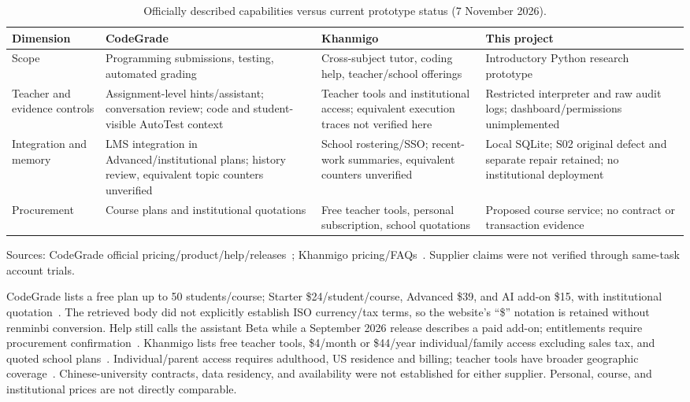 \begin{table}[htbp]\centering\small
\caption{Officially described capabilities versus current prototype status (7 November 2026).}\label{tab:concise-business-competitors}
\begin{tabularx}{\linewidth}{@{}p{23mm}Y Y Y@{}}\toprule
Dimension & CodeGrade & Khanmigo & This project\\\midrule
Scope & Programming submissions, testing, automated grading & Cross-subject tutor, coding help, teacher/school offerings & Introductory Python research prototype\\
Teacher and evidence controls & Assignment-level hints/assistant; conversation review; code and student-visible AutoTest context & Teacher tools and institutional access; equivalent execution traces not verified here & Restricted interpreter and raw audit logs; dashboard/permissions unimplemented\\
Integration and memory & LMS integration in Advanced/institutional plans; history review, equivalent topic counters unverified & School rostering/SSO; recent-work summaries, equivalent counters unverified & Local SQLite; S02 original defect and separate repair retained; no institutional deployment\\
Procurement & Course plans and institutional quotations & Free teacher tools, personal subscription, school quotations & Proposed course service; no contract or transaction evidence\\\bottomrule
\end{tabularx}
\par\smallskip\raggedright\scriptsize Sources: CodeGrade official pricing/product/help/releases~\cite{businesscgprice,businesscgai,businesscghelp,businesscgrelease}; Khanmigo pricing/FAQs~\cite{businesskhanprice,businesskhan}. Supplier claims were not verified through same-task account trials.
\end{table}\FloatBarrier

CodeGrade lists a free plan up to 50 students/course; Starter \$24/student/course, Advanced \$39, and AI add-on \$15, with institutional quotation~\cite{businesscgprice}. The retrieved body did not explicitly establish ISO currency/tax terms, so the website's ``\$'' notation is retained without renminbi conversion. Help still calls the assistant Beta while a September 2026 release describes a paid add-on; entitlements require procurement confirmation~\cite{businesscghelp,businesscgrelease}. Khanmigo lists free teacher tools, \$4/month or \$44/year individual/family access excluding sales tax, and quoted school plans~\cite{businesskhanprice}. Individual/parent access requires adulthood, US residence and billing; teacher tools have broader geographic coverage~\cite{businesskhan,businesskhangeo}. Chinese-university contracts, data residency, and availability were not established for either supplier. Personal, course, and institutional prices are not directly comparable.

